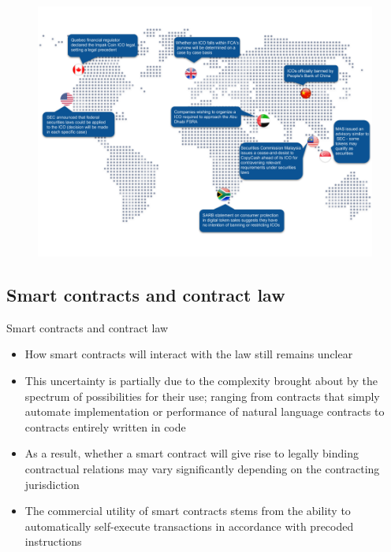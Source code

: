 \documentclass[9pt]{beamer}
\begin{document}


\begin{frame}
	\begin{figure}[]
		\centering
		\includegraphics  [scale=0.3]{Images/ico-map}
	\end{figure}
\end{frame}


\subsection{Smart contracts and contract law}

\begin{frame}{Smart contracts and contract law}
	\begin{itemize}
		\item How smart contracts will interact with the law still remains unclear
		\item This uncertainty is partially due to the complexity brought about by the spectrum of possibilities for their use; ranging from contracts that simply automate implementation or performance of natural language contracts to contracts entirely written in code
		\item As a result, whether a smart contract will give rise to legally binding contractual relations may vary significantly depending on the contracting jurisdiction
		\item The commercial utility of smart contracts stems from the ability to automatically self-execute transactions in accordance with precoded instructions
	\end{itemize}
\end{frame}
\end{document}
